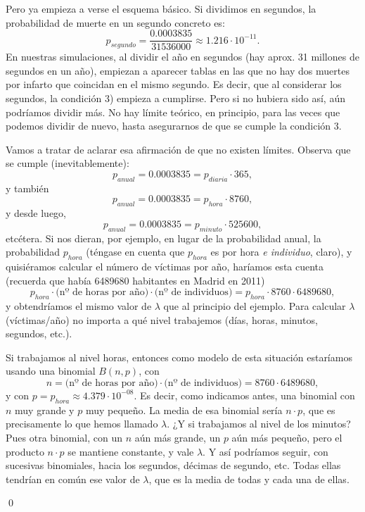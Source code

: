 \begin{ejemplo}
Pero ya empieza a verse el esquema básico. Si dividimos en segundos, la probabilidad de muerte en
un segundo concreto es:
    \[p_{segundo}=\dfrac{0.0003835}{31536000}\approx  1.216\cdot 10^{-11}.\]
En nuestras simulaciones, al dividir el año en segundos (hay aprox. 31 millones de segundos en un
año), empiezan a aparecer tablas en las que no hay dos muertes por infarto que coincidan en el
mismo segundo. Es decir, que al considerar los segundos, la condición 3) empieza a cumplirse. Pero
si no hubiera sido así, aún podríamos dividir más. No hay límite teórico, en principio, para las
veces que podemos dividir de nuevo, hasta asegurarnos de que se cumple la condición 3.

Vamos a tratar de aclarar esa afirmación de que no existen límites. Observa que se cumple
(inevitablemente):
    \[p_{anual}=0.0003835= p_{diaria}\cdot 365,\]
y también
    \[p_{anual}=0.0003835= p_{hora}\cdot 8760,\]
y desde luego,
    \[p_{anual}=0.0003835= p_{minuto}\cdot 525600,\]
etcétera. Si nos dieran, por ejemplo, en lugar de la probabilidad anual, la probabilidad $p_{hora}$
(téngase en cuenta que $p_{hora}$ es por hora {\em e individuo}, claro), y quisiéramos calcular el
número de víctimas por año, haríamos esta cuenta (recuerda que había 6489680 habitantes en Madrid
en 2011)
    \[p_{hora}\cdot\mbox{(nº de horas por año)}\cdot \mbox{(nº de individuos)}=
    p_{hora}\cdot 8760 \cdot 6489680,\]
y obtendríamos el mismo valor de $\lambda$ que al principio del ejemplo. Para calcular $\lambda$
(víctimas/año) no importa a qu\'e nivel trabajemos (días, horas, minutos, segundos, etc.).

Si trabajamos al nivel horas, entonces como modelo de esta situación estaríamos usando una binomial
$B(n,p)$, con
\[n= \mbox{(nº de horas por año)}\cdot \mbox{(nº de individuos)}=8760 \cdot 6489680,\]
y con $p=p_{hora}\approx 4.379\cdot 10^{-08}$. Es decir, como indicamos antes, una binomial con $n$
muy grande y $p$ muy pequeño. La media de esa binomial sería $n\cdot p$, que es precisamente lo que
hemos llamado $\lambda$. ¿Y si trabajamos al nivel de los minutos? Pues otra binomial, con un $n$
aún más grande, un $p$ aún más pequeño, pero el producto $n\cdot p$ se mantiene constante, y vale
$\lambda$. Y así podríamos seguir, con sucesivas binomiales, hacia los segundos, décimas de
segundo, etc. Todas ellas tendrían en común ese valor de $\lambda$, que es la media de todas y cada
una de ellas.

\qed
\end{ejemplo}

